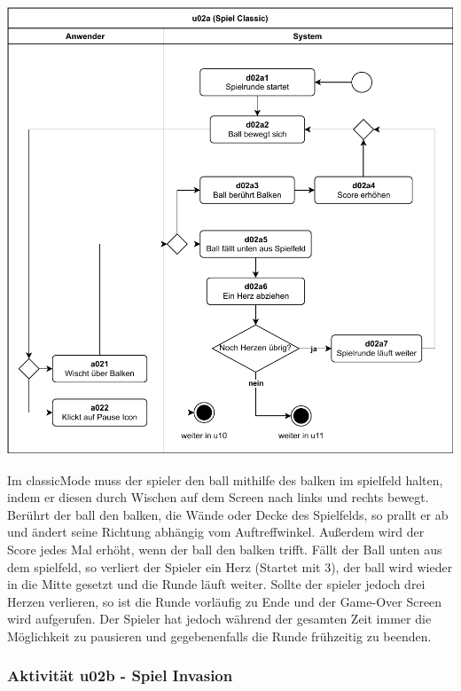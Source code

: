 \vspace*{1cm}

\includegraphics[width=\linewidth]{diagramme/pdf/UML-Activity-u02a.pdf}
\label{fig:dia:classic}
\vspace*{0.5cm}


Im \gls{classicMode} muss der \gls{spieler} den \gls{ball} mithilfe des \gls{balken} im \gls{spielfeld} halten, indem er diesen durch Wischen auf dem Screen nach links und rechts bewegt. Berührt der \gls{ball} den \gls{balken}, die Wände oder Decke des Spielfelds, so prallt er ab und ändert seine Richtung abhängig vom Auftreffwinkel. Außerdem wird der Score jedes Mal erhöht, wenn der \gls{ball} den \gls{balken} trifft.
Fällt der Ball unten aus dem \gls{spielfeld}, so verliert der Spieler ein Herz (Startet mit 3), der \gls{ball} wird wieder in die Mitte gesetzt und die Runde läuft weiter. Sollte der \gls{spieler} jedoch drei Herzen verlieren, so ist die Runde vorläufig zu Ende und der Game-Over Screen wird aufgerufen.
Der Spieler hat jedoch während der gesamten Zeit immer die Möglichkeit zu pausieren und gegebenenfalls die Runde frühzeitig zu beenden.  


\clearpage
\subsubsection{Aktivität u02b - Spiel Invasion}

